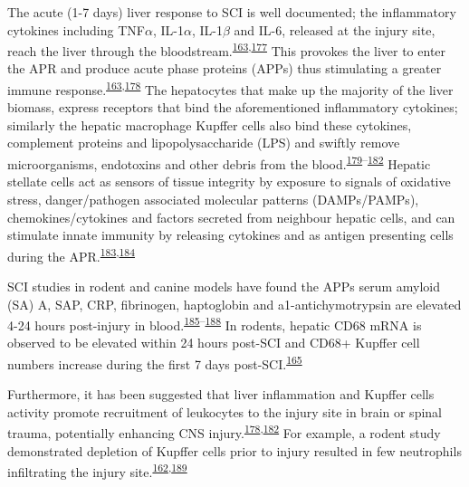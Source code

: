 \documentclass[
]{article}
\begin{document}
The acute (1-7 days) liver response to SCI is well documented; the inflammatory cytokines including TNF\(\alpha\), IL-1\(\alpha\), IL-1\(\beta\) and IL-6, released at the injury site, reach the liver through the bloodstream.\textsuperscript{\protect\hyperlink{ref-fleming_remote_2012}{163},\protect\hyperlink{ref-hundt_assessment_2011}{177}}
This provokes the liver to enter the APR and produce acute phase proteins (APPs) thus stimulating a greater immune response.\textsuperscript{\protect\hyperlink{ref-fleming_remote_2012}{163},\protect\hyperlink{ref-anthony_systemic_2014}{178}}
The hepatocytes that make up the majority of the liver biomass, express receptors that bind the aforementioned inflammatory cytokines; similarly the hepatic macrophage Kupffer cells also bind these cytokines, complement proteins and lipopolysaccharide (LPS) and swiftly remove microorganisms, endotoxins and other debris from the blood.\textsuperscript{\protect\hyperlink{ref-yang_clec4f_2013}{179}--\protect\hyperlink{ref-campbell_central_2005}{182}}
Hepatic stellate cells act as sensors of tissue integrity by exposure to signals of oxidative stress,   danger/pathogen associated molecular patterns (DAMPs/PAMPs), chemokines/cytokines and factors secreted from neighbour hepatic cells, and can stimulate innate immunity by releasing cytokines and as antigen presenting cells during the APR.\textsuperscript{\protect\hyperlink{ref-weiskirchen_cellular_2014}{183},\protect\hyperlink{ref-fujita_roles_2016}{184}}

SCI studies in rodent and canine models have found the APPs serum amyloid (SA) A, SAP, CRP, fibrinogen, haptoglobin and a1-antichymotrypsin are elevated 4-24 hours post-injury in blood.\textsuperscript{\protect\hyperlink{ref-pepys_acute_1983}{185}--\protect\hyperlink{ref-steel_major_1994}{188}}
In rodents, hepatic CD68 mRNA is observed to be elevated within 24 hours post-SCI and CD68+ Kupffer cell numbers increase during the first 7 days post-SCI.\textsuperscript{\protect\hyperlink{ref-sauerbeck_spinal_2015}{165}}

Furthermore, it has been suggested that liver inflammation and Kupffer cells activity promote recruitment of leukocytes to the injury site in brain or spinal trauma, potentially enhancing CNS injury.\textsuperscript{\protect\hyperlink{ref-anthony_systemic_2014}{178},\protect\hyperlink{ref-campbell_central_2005}{182}}
For example, a rodent study demonstrated depletion of Kupffer cells prior to injury resulted in few neutrophils infiltrating the injury site.\textsuperscript{\protect\hyperlink{ref-campbell_liver_2008}{162},\protect\hyperlink{ref-campbell_hepatic_2008}{189}}
\end{document}
